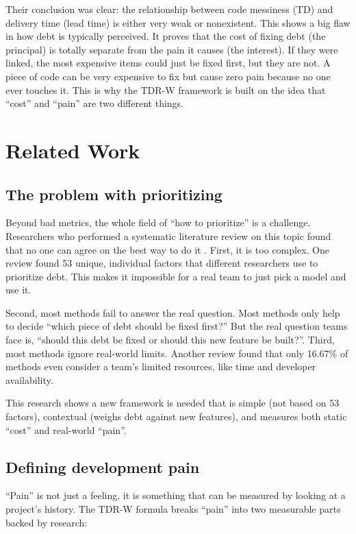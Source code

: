 \documentclass[journal]{IEEEtran}
\begin{document}
Their conclusion was clear: the relationship between code messiness (TD) and delivery time (lead time) is either very weak or nonexistent. This shows a big flaw in how debt is typically perceived. It proves that the cost of fixing debt (the principal) is totally separate from the pain it causes (the interest). If they were linked, the most expensive items could just be fixed first, but they are not. A piece of code can be very expensive to fix but cause zero pain because no one ever touches it. This is why the TDR-W framework is built on the idea that ``cost'' and ``pain'' are two different things.

\section{Related Work}

\subsection{The problem with prioritizing}
Beyond bad metrics, the whole field of ``how to prioritize'' is a challenge. Researchers who performed a systematic literature review on this topic found that no one can agree on the best way to do it \cite{b4}. First, it is too complex. One review found 53 unique, individual factors that different researchers use to prioritize debt. This makes it impossible for a real team to just pick a model and use it.

Second, most methods fail to answer the real question. Most methods only help to decide ``which piece of debt should be fixed first?'' But the real question teams face is, ``should this debt be fixed or should this new feature be built?''. Third, most methods ignore real-world limits. Another review found that only 16.67\% of methods even consider a team's limited resources, like time and developer availability.

This research shows a new framework is needed that is simple (not based on 53 factors), contextual (weighs debt against new features), and measures both static ``cost'' and real-world ``pain''.

\subsection{Defining development pain}
``Pain'' is not just a feeling, it is something that can be measured by looking at a project's history. The TDR-W formula breaks ``pain'' into two measurable parts backed by research:
\end{document}
